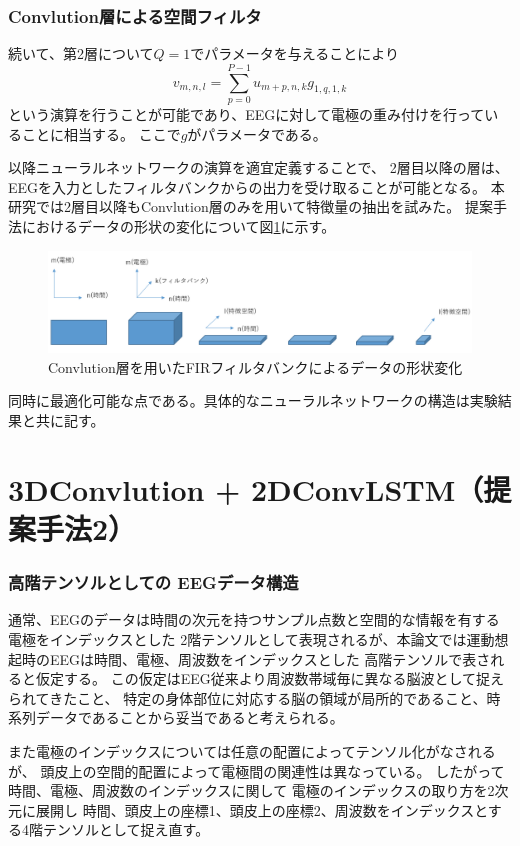 \subsubsection{\rm Convlution\mc 層による空間フィルタ}
続いて、第2層について\(Q=1\)でパラメータを与えることにより
\begin{equation}
    v_{m,n,l} = \sum_{p=0}^{P-1} u_{m+p,n,k} g_{1,q,1,k}
    \label{eq:pseudoFIR}
\end{equation} 
という演算を行うことが可能であり、EEGに対して電極の重み付けを行っていることに相当する。
ここで\(g\)がパラメータである。

以降ニューラルネットワークの演算を適宜定義することで、
2層目以降の層は、EEGを入力としたフィルタバンクからの出力を受け取ることが可能となる。
本研究では2層目以降もConvlution層のみを用いて特徴量の抽出を試みた。
提案手法におけるデータの形状の変化について図\ref{fig:pseudFBCSP}に示す。
\begin{figure}[t]
    \centering
    \includegraphics[width=13cm]{images/pseudFBCSP.png}
    \caption{Convlution層を用いたFIRフィルタバンクによるデータの形状変化}
    \label{fig:pseudFBCSP}
\end{figure}

同時に最適化可能な点である。具体的なニューラルネットワークの構造は実験結果と共に記す。


\section{\rm 3DConvlution + 2DConvLSTM\mc （提案手法2）}
\subsubsection{\mc 高階テンソルとしての \rm EEG\mc データ構造}
通常、EEGのデータは時間の次元を持つサンプル点数と空間的な情報を有する電極をインデックスとした
2階テンソルとして表現されるが、本論文では運動想起時のEEGは時間、電極、周波数をインデックスとした
高階テンソルで表されると仮定する。
この仮定はEEG従来より周波数帯域毎に異なる脳波として捉えられてきたこと、
特定の身体部位に対応する脳の領域が局所的であること、時系列データであることから妥当であると考えられる。

また電極のインデックスについては任意の配置によってテンソル化がなされるが、
頭皮上の空間的配置によって電極間の関連性は異なっている。
したがって時間、電極、周波数のインデックスに関して
電極のインデックスの取り方を2次元に展開し
時間、頭皮上の座標1、頭皮上の座標2、周波数をインデックスとする4階テンソルとして捉え直す。


